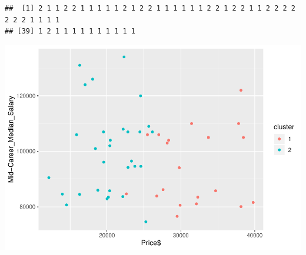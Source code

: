 \documentclass[]{article}
\newenvironment{Shaded}{\begin{snugshade}}{\end{snugshade}}
\newcommand{\KeywordTok}[1]{\textcolor[rgb]{0.13,0.29,0.53}{\textbf{#1}}}
\newcommand{\DataTypeTok}[1]{\textcolor[rgb]{0.13,0.29,0.53}{#1}}
\newcommand{\StringTok}[1]{\textcolor[rgb]{0.31,0.60,0.02}{#1}}
\newcommand{\OperatorTok}[1]{\textcolor[rgb]{0.81,0.36,0.00}{\textbf{#1}}}
\newcommand{\NormalTok}[1]{#1}
\begin{document}
\begin{verbatim}
##  [1] 2 1 1 2 2 1 1 1 1 1 2 1 2 2 1 1 1 1 1 1 2 2 1 2 2 1 1 2 2 2 2 2 2 2 1 1 1 1
## [39] 1 2 1 1 1 1 1 1 1 1 1 1
\end{verbatim}

\begin{Shaded}
\end{Shaded}

\begin{center}\includegraphics{project1_files/figure-latex/unnamed-chunk-5-6} \end{center}
\end{document}
